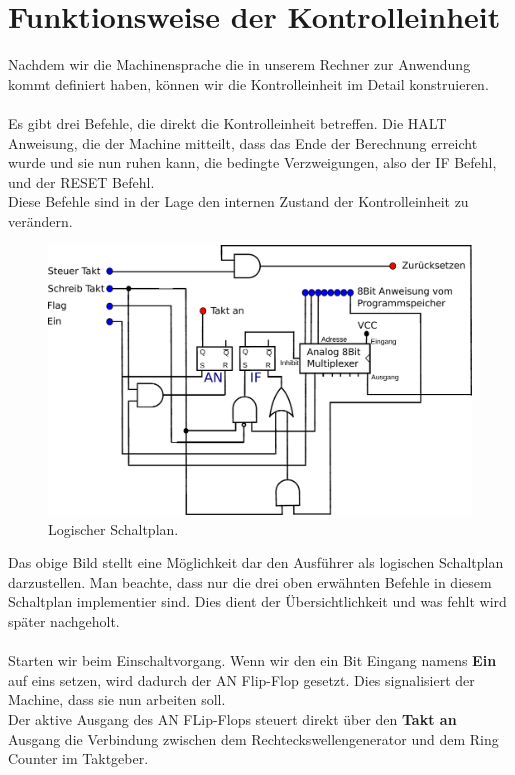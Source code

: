\documentclass[11pt,a4paper,leqno]{report}
\numberwithin{equation}{chapter}
\begin{document}
\section{Funktionsweise der Kontrolleinheit}
Nachdem wir die Machinensprache die in unserem Rechner zur Anwendung kommt definiert haben, k\"onnen wir die Kontrolleinheit im Detail konstruieren.\\
\\
Es gibt drei Befehle, die direkt die Kontrolleinheit betreffen. Die HALT Anweisung, die der Machine mitteilt, dass das Ende der Berechnung erreicht wurde und sie nun ruhen kann, die bedingte Verzweigungen, also der IF Befehl, und der RESET Befehl.\\
Diese Befehle sind in der Lage den internen Zustand der Kontrolleinheit zu ver\"andern.
\begin{figure}[H]
	\begin{center}
		\includegraphics[scale=0.6]{Bilder/ausfuhrer.pdf}
		\caption{Logischer Schaltplan.}
	\end{center}
\end{figure}
\noindent
Das obige Bild stellt eine M\"oglichkeit dar den Ausf\"uhrer als logischen Schaltplan darzustellen. Man beachte, dass nur die drei oben erw\"ahnten Befehle in diesem Schaltplan implementier sind. Dies dient der \"Ubersichtlichkeit und was fehlt wird sp\"ater nachgeholt.\\
\\
Starten wir beim Einschaltvorgang. Wenn wir den ein Bit Eingang namens \textbf{Ein} auf eins setzen, wird dadurch der AN Flip-Flop gesetzt. Dies signalisiert der Machine, dass sie nun arbeiten soll.\\
Der aktive Ausgang des AN FLip-Flops steuert direkt \"uber den \textbf{Takt an} Ausgang die Verbindung zwischen dem Rechteckswellengenerator und dem Ring Counter im Taktgeber.
\end{document}
